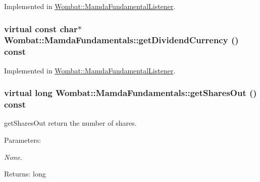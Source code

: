 Implemented in \hyperlink{classWombat_1_1MamdaFundamentalListener_da3a7f2c8e3800e187af0198f8a6ab1c}{Wombat::Mamda\-Fundamental\-Listener}.\hypertarget{classWombat_1_1MamdaFundamentals_fb9076a1d81b7f5c7480950521eff35a}{
\subsubsection[getDividendCurrency]{\setlength{\rightskip}{0pt plus 5cm}virtual const char$\ast$ Wombat::Mamda\-Fundamentals::get\-Dividend\-Currency () const}}
\label{classWombat_1_1MamdaFundamentals_fb9076a1d81b7f5c7480950521eff35a}




Implemented in \hyperlink{classWombat_1_1MamdaFundamentalListener_6ef9676f4d187e8cdb6e2211260b4768}{Wombat::Mamda\-Fundamental\-Listener}.\hypertarget{classWombat_1_1MamdaFundamentals_47890caba7011068a8e2dc9222e883f4}{
\subsubsection[getSharesOut]{\setlength{\rightskip}{0pt plus 5cm}virtual long Wombat::Mamda\-Fundamentals::get\-Shares\-Out () const}}
\label{classWombat_1_1MamdaFundamentals_47890caba7011068a8e2dc9222e883f4}


get\-Shares\-Out return the number of shares. 

\begin{Desc}
\item[Parameters:]
\begin{description}
\item[{\em None.}]\end{description}
\end{Desc}
\begin{Desc}
\item[Returns:]long\end{Desc}


